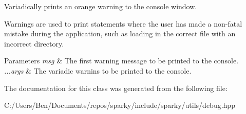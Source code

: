 Variadically prints an orange warning to the console window. 

Warnings are used to print statements where the user has made a non-\/fatal mistake during the application, such as loading in the correct file with an incorrect directory.


\begin{DoxyParams}{Parameters}
{\em msg} & The first warning message to be printed to the console. \\
\hline
{\em ...\+args} & The variadic warnins to be printed to the console. \\
\hline
\end{DoxyParams}


The documentation for this class was generated from the following file\+:\begin{DoxyCompactItemize}
\item 
C\+:/\+Users/\+Ben/\+Documents/repos/sparky/include/sparky/utils/debug.\+hpp\end{DoxyCompactItemize}
